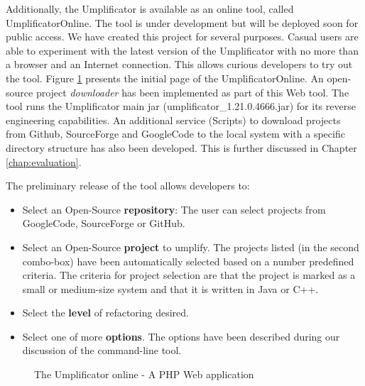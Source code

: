 Additionally, the Umplificator is available as an online tool, called UmplificatorOnline. The tool is under development but will be deployed soon for public access. We have created this project for several purposes. Casual users are able to experiment with the latest version of the Umplificator with no more than a browser and an Internet connection. This allows curious developers to try out the tool. Figure \ref{fig:umpleonline} presents the initial page of the UmplificatorOnline.
An open-source project \textit{downloader} has been implemented as part of this Web tool. The tool runs the  Umplificator main jar (umplificator\_1.21.0.4666.jar) for its reverse engineering capabilities. An additional service (Scripts) to download projects from Github, SourceForge and GoogleCode to the local system with a specific directory structure has also been developed. This is further discussed in Chapter \ref{chap:evaluation}.

The preliminary release of the tool allows developers to:

\begin{itemize}
\item Select an Open-Source \textbf{repository}: The user can select projects from GoogleCode, SourceForge or GitHub.
\item Select an Open-Source \textbf{project} to umplify. The projects listed (in the second combo-box) have been automatically selected based on a number predefined criteria. The criteria for project selection are that the project is marked as a small or medium-size system and that it is written in Java or C++.
\item Select the \textbf{level} of refactoring desired.
\item Select one of more \textbf{options}. The options have been described during our discussion of the command-line tool.
\end{itemize}

\begin{figure}[h]
\centering
{}
\caption{The Umplificator online - A PHP Web application}
\label{fig:umpleonline}
\end{figure}


